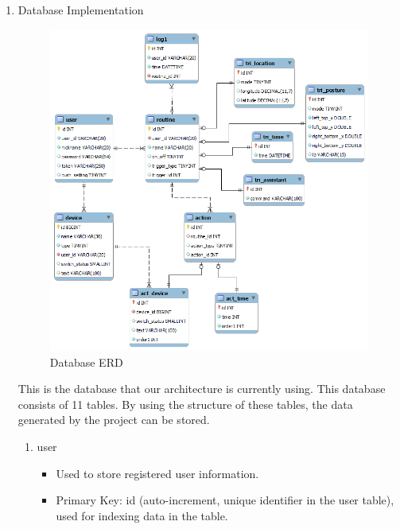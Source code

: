 \begin{enumerate}
    \item Database Implementation\\
            \begin{figure}[!htb]
                \begin{center}
                    \includegraphics[width=12cm]{imgs/architecture_design_and_implementation/database-erd.png}
                    \caption{Database ERD} 
                    \renewcommand{\thefigure}{\thesubsection.\arabic{figure}}
                \end{center}
            \end{figure}
          This is the database that our architecture is currently using. This database consists of 11 tables. By using the structure of these tables, the data generated by the project can be stored.\\
          \begin{enumerate}
              \item user
                    \begin{itemize}
                        \item Used to store registered user information.
                        \item Primary Key: id (auto-increment, unique identifier in the user table), used for indexing data in the table.

\end{itemize}
\end{enumerate}
\end{enumerate}
